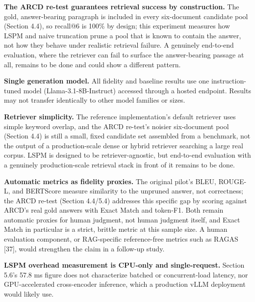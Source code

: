 \documentclass[pdflatex,sn-basic,Numbered]{sn-jnl}
\begin{document}
\textbf{The ARCD re-test guarantees retrieval success by construction.} The gold, answer-bearing paragraph is included in every six-document candidate pool (Section 4.4), so recall@6 is 100\% by design; this experiment measures how LSPM and naive truncation prune a pool that is known to contain the answer, not how they behave under realistic retrieval failure. A genuinely end-to-end evaluation, where the retriever can fail to surface the answer-bearing passage at all, remains to be done and could show a different pattern.

\textbf{Single generation model.} All fidelity and baseline results use one instruction-tuned model (Llama-3.1-8B-Instruct) accessed through a hosted endpoint. Results may not transfer identically to other model families or sizes.

\textbf{Retriever simplicity.} The reference implementation's default retriever uses simple keyword overlap, and the ARCD re-test's noisier six-document pool (Section 4.4) is still a small, fixed candidate set assembled from a benchmark, not the output of a production-scale dense or hybrid retriever searching a large real corpus. LSPM is designed to be retriever-agnostic, but end-to-end evaluation with a genuinely production-scale retrieval stack in front of it remains to be done.

\textbf{Automatic metrics as fidelity proxies.} The original pilot's BLEU, ROUGE-L, and BERTScore measure similarity to the unpruned answer, not correctness; the ARCD re-test (Section 4.4/5.4) addresses this specific gap by scoring against ARCD's real gold answers with Exact Match and token-F1. Both remain automatic proxies for human judgment, not human judgment itself, and Exact Match in particular is a strict, brittle metric at this sample size. A human evaluation component, or RAG-specific reference-free metrics such as RAGAS [37], would strengthen the claim in a follow-up study.

\textbf{LSPM overhead measurement is CPU-only and single-request.} Section 5.6's 57.8 ms figure does not characterize batched or concurrent-load latency, nor GPU-accelerated cross-encoder inference, which a production vLLM deployment would likely use.
\end{document}
